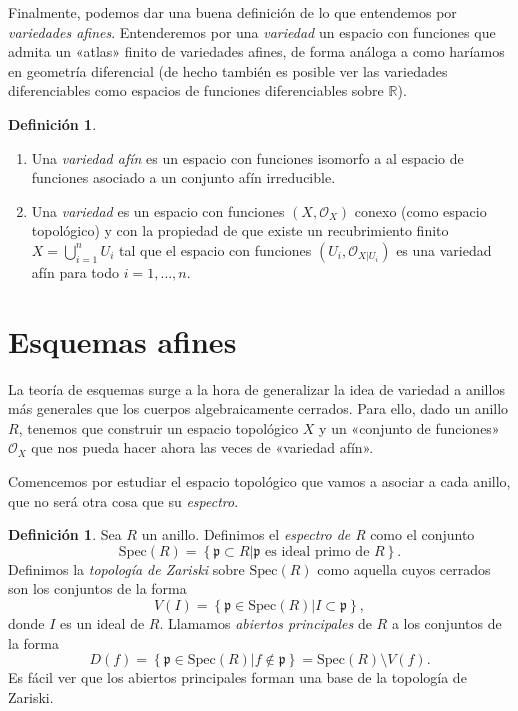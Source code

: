 \documentclass[12pt,a4paper]{article}
\theoremstyle{definition} \newtheorem{defn}[thm]{Definición}
\theoremstyle{definition} \newtheorem{ejemplo}[thm]{Ejemplo}
\theoremstyle{definition} \newtheorem{ejercicio}[thm]{Ejercicio}
\theoremstyle{remark} \newtheorem*{obs}{Observación}
\def\sp{\mathrm{Spec}}
\def\pp{\mathfrak{p}}
\def\RR{\mathbb{R}}
\def\OO{\mathscr{O}}
\begin{document}
      Finalmente, podemos dar una buena definición de lo que entendemos por \emph{variedades afines}. Entenderemos por una \emph{variedad} un espacio con funciones que admita un «atlas» finito de variedades afines, de forma análoga a como haríamos en geometría diferencial (de hecho también es posible ver las variedades diferenciables como espacios de funciones diferenciables sobre $\RR$).
      \begin{defn}\leavevmode
	\begin{enumerate}
      \item Una \emph{variedad afín} es un espacio con funciones isomorfo a al espacio de funciones asociado a un conjunto afín irreducible.
      \item Una \emph{variedad} es un espacio con funciones $(X,\OO_X)$ conexo (como espacio topológico) y con la propiedad de que existe un recubrimiento finito $X=\bigcup_{i=1}^nU_i$ tal que el espacio con funciones $(U_i,\OO_{X|U_i})$ es una variedad afín para todo $i=1,\dots,n$.
    \end{enumerate}
      \end{defn}

      \section{Esquemas afines}
      La teoría de esquemas surge a la hora de generalizar la idea de variedad a anillos más generales que los cuerpos algebraicamente cerrados. Para ello, dado un anillo $R$, tenemos que construir un espacio topológico $X$ y un «conjunto de funciones» $\OO_X$ que nos pueda hacer ahora las veces de «variedad afín».

      Comencemos por estudiar el espacio topológico que vamos a asociar a cada anillo, que no será otra cosa que su \emph{espectro}.
      \begin{defn}
	Sea $R$ un anillo. Definimos el \emph{espectro de R} como el conjunto
	\begin{equation*}
	  \sp(R)=\left\{\pp \subset R | \pp \text{ es ideal primo de } R  \right\}. 
	\end{equation*}
	Definimos la \emph{topología de Zariski} sobre $\sp(R)$ como aquella cuyos cerrados son los conjuntos de la forma
	\begin{equation*}
	  V(I)=\left\{ \pp \in \sp(R) | I\subset \pp \right\},
	\end{equation*}
	donde $I$ es un ideal de $R$. Llamamos \emph{abiertos principales} de $R$ a los conjuntos de la forma
	\begin{equation*}
	  D(f)=\left\{ \pp \in \sp(R)| f \not\in \pp \right\}=\sp(R) \setminus V(f).
	\end{equation*}
	Es fácil ver que los abiertos principales forman una base de la topología de Zariski.
      \end{defn}
\end{document}
